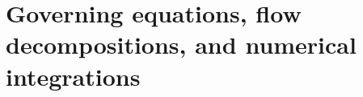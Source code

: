\documentclass[../Rajarshi-thesis-draft.tex]{subfiles}
\begin{document}


 

\section{Governing equations, flow decompositions, and numerical integrations} \label{edwv-dets}
\end{document}

